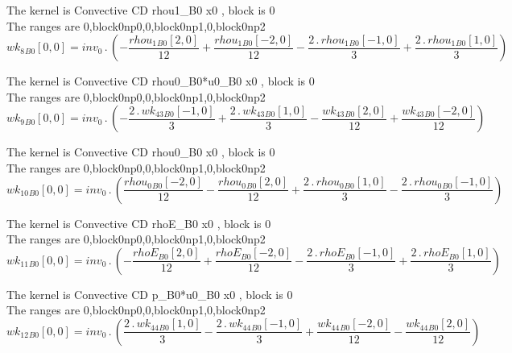 \documentclass{article}
\begin{document}
\noindent The kernel is Convective CD rhou1_B0 x0 , block is 0\\\noindent The ranges are 0,block0np0,0,block0np1,0,block0np2\\\begin{dmath}{wk_{8}{_{B0}}}[{0,0}] = inv_0 \,.\, \left(- \frac{{rhou_{1}{_{B0}}}[{2,0}]}{12} + \frac{{rhou_{1}{_{B0}}}[{-2,0}]}{12} - \frac{2 \,.\, {rhou_{1}{_{B0}}}[{-1,0}]}{3} + \frac{2 \,.\, {rhou_{1}{_{B0}}}[{1,0}]}{3}\right)\end{dmath}

\noindent The kernel is Convective CD rhou0_B0*u0_B0 x0 , block is 0\\\noindent The ranges are 0,block0np0,0,block0np1,0,block0np2\\\begin{dmath}{wk_{9}{_{B0}}}[{0,0}] = inv_0 \,.\, \left(- \frac{2 \,.\, {wk_{43}{_{B0}}}[{-1,0}]}{3} + \frac{2 \,.\, {wk_{43}{_{B0}}}[{1,0}]}{3} - \frac{{wk_{43}{_{B0}}}[{2,0}]}{12} + \frac{{wk_{43}{_{B0}}}[{-2,0}]}{12}\right)\end{dmath}

\noindent The kernel is Convective CD rhou0_B0 x0 , block is 0\\\noindent The ranges are 0,block0np0,0,block0np1,0,block0np2\\\begin{dmath}{wk_{10}{_{B0}}}[{0,0}] = inv_0 \,.\, \left(\frac{{rhou_{0}{_{B0}}}[{-2,0}]}{12} - \frac{{rhou_{0}{_{B0}}}[{2,0}]}{12} + \frac{2 \,.\, {rhou_{0}{_{B0}}}[{1,0}]}{3} - \frac{2 \,.\, {rhou_{0}{_{B0}}}[{-1,0}]}{3}\right)\end{dmath}

\noindent The kernel is Convective CD rhoE_B0 x0 , block is 0\\\noindent The ranges are 0,block0np0,0,block0np1,0,block0np2\\\begin{dmath}{wk_{11}{_{B0}}}[{0,0}] = inv_0 \,.\, \left(- \frac{{rhoE{_{B0}}}[{2,0}]}{12} + \frac{{rhoE{_{B0}}}[{-2,0}]}{12} - \frac{2 \,.\, {rhoE{_{B0}}}[{-1,0}]}{3} + \frac{2 \,.\, {rhoE{_{B0}}}[{1,0}]}{3}\right)\end{dmath}

\noindent The kernel is Convective CD p_B0*u0_B0 x0 , block is 0\\\noindent The ranges are 0,block0np0,0,block0np1,0,block0np2\\\begin{dmath}{wk_{12}{_{B0}}}[{0,0}] = inv_0 \,.\, \left(\frac{2 \,.\, {wk_{44}{_{B0}}}[{1,0}]}{3} - \frac{2 \,.\, {wk_{44}{_{B0}}}[{-1,0}]}{3} + \frac{{wk_{44}{_{B0}}}[{-2,0}]}{12} - \frac{{wk_{44}{_{B0}}}[{2,0}]}{12}\right)\end{dmath}
\end{document}
